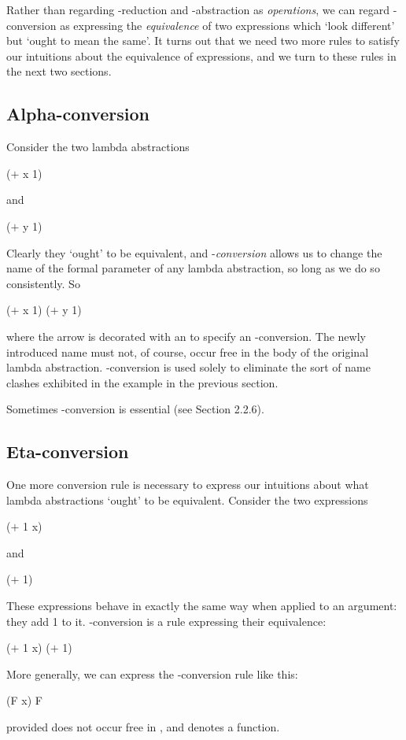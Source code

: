 Rather than regarding \tb{}-reduction and \tb{}-abstraction as \textit{operations}, we can regard \tb{}-conversion as expressing the \textit{equivalence} of two expressions which `look different' but `ought to mean the same'. It turns out that we need two more rules to satisfy our intuitions about the equivalence of expressions, and we turn to these rules in the next two sections.

\subsection{Alpha-conversion}
Consider the two lambda abstractions
\begin{mlcoded}
    ($+$ x 1)
\end{mlcoded}
and
\begin{mlcoded}
    ($+$ y 1)
\end{mlcoded}
Clearly they `ought' to be equivalent, and \ta-\textit{conversion} allows us to change the name of the formal parameter of any lambda abstraction, so long as we do so consistently. So
\begin{mlcoded}
    ($+$ x 1) \conversion{\alpha} ($+$ y 1)
\end{mlcoded}
where the arrow is decorated with an \ta{} to specify an \ta-conversion. The newly introduced name must not, of course, occur free in the body of the original lambda abstraction. \ta-conversion is used solely to eliminate the sort of name clashes exhibited in the example in the previous section.

Sometimes \ta{}-conversion is essential (see Section 2.2.6).

\subsection{Eta-conversion}
One more conversion rule is necessary to express our intuitions about what lambda abstractions `ought' to be equivalent. Consider the two expressions
\begin{mlcoded}
    ($+$ 1 x)
\end{mlcoded}
and
\begin{mlcoded}
    ($+$ 1)
\end{mlcoded}
These expressions behave in exactly the same way when applied to an argument: they add 1 to it. \te{}-conversion is a rule expressing their equivalence:
\begin{mlcoded}
    ($+$ 1 x) \reduction{\eta} ($+$ 1)
\end{mlcoded}
More generally, we can express the \te{}-conversion rule like this:
\begin{mlcoded}
    (F x) \reduction{\eta} F
\end{mlcoded}
provided  does not occur free in , and  denotes a function.

